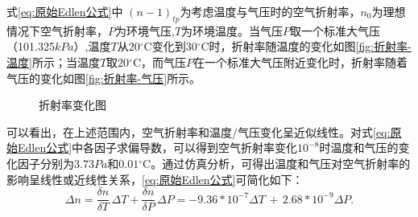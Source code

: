 式\eqref{eq:原始Edlen公式}中 \((n-1)_{tp}\)为考虑温度与气压时的空气折射率，\(n_0\)为理想情况下空气折射率，\(P\)为环境气压,\(T\)为环境温度。当气压\(P\)取一个标准大气压（101.325\(kPa\)）,温度\(T\)从\(20\)$^{\circ}$C变化到\(30\)$^{\circ}$C时，折射率随温度的变化如图\ref{fig:折射率-温度}所示；当温度\(T\)取\(20\)$^{\circ}$C，而气压\(P\)在一个标准大气压附近变化时，折射率随着气压的变化如图\ref{fig:折射率-气压}所示。
\begin{figure}[htb]
    \centering
    \caption{折射率变化图}
    \label{fig:折射率变化图}
  \end{figure}

可以看出，在上述范围内，空气折射率和温度/气压变化呈近似线性\cite{李博2021温度对激光干涉法测量气体动态压力的影响}。对式\eqref{eq:原始Edlen公式}中各因子求偏导数，可以得到空气折射率变化\(10^{-8}\)时温度和气压的变化因子分别为\(3.73Pa\)和\(0.01\)$^{\circ}$C\cite{2015Approach}。通过仿真分析，可得出温度和气压对空气折射率的影响呈线性或近线性关系，\eqref{eq:原始Edlen公式}可简化如下\cite{elden公式法在双频激光干涉仪测量系统的应用}：
\begin{equation}\label{eq:线性形式的Edlen公式}
    \Delta n=\frac{\delta n}{\delta T}\,\Delta T+\frac{\delta n}{\delta P}\,\Delta P
    =-9.36*10^{-7}\Delta T\,+\,2.68*10^{-9}\Delta P.
    \end{equation}

